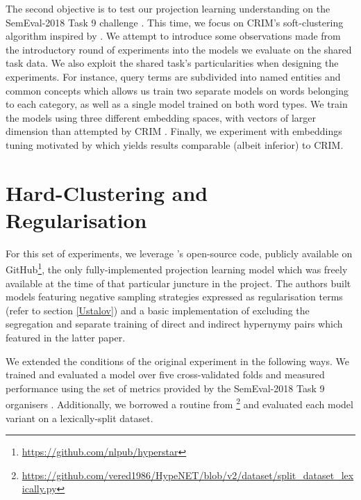 The second objective is to test our projection learning understanding on the SemEval-2018 Task 9 challenge \citep{camacho2018semeval}.  This time, we focus on CRIM's soft-clustering algorithm \citep{bernier2018crim} inspired by \citeauthor{yamane2016distributional}.  We attempt to introduce some observations made from the introductory round of experiments into the models we evaluate on the shared task data.  We also exploit the shared task's particularities when designing the experiments.  For instance, query terms are subdivided into named entities and common concepts which allows us train two separate models on words belonging to each category, as well as a single model trained on both word types.  We train the models using three different embedding spaces, with vectors of larger dimension than attempted by CRIM \citep{bernier2018crim}.  Finally, we experiment with embeddings tuning motivated by \cite{howard2018universal} which yields results comparable (albeit inferior) to CRIM.  


\section{Hard-Clustering and Regularisation} \label{ustalov_experiment}
For this set of experiments, we leverage \citeauthor{ustalov2017negative}'s open-source code, publicly available on GitHub\footnote{\url{https://github.com/nlpub/hyperstar}}, the only fully-implemented projection learning model which was freely available at the time of that particular juncture in the project.  The authors built models featuring  negative sampling strategies expressed as regularisation terms (refer to section \ref{Ustalov}) and a basic implementation of \cite{Fu2014} excluding the segregation and separate training of direct and indirect hypernymy pairs which featured in the latter paper.

We extended the conditions of the original experiment in the following ways.  We trained and evaluated a model over five cross-validated folds and measured performance using the set of metrics provided by the SemEval-2018 Task 9 organisers \citep{camacho2018semeval}.  Additionally, we borrowed a routine from \cite{shwartz2016path}\footnote{\url{https://github.com/vered1986/HypeNET/blob/v2/dataset/split_dataset_lexically.py}} and evaluated each model variant on a lexically-split dataset.  

